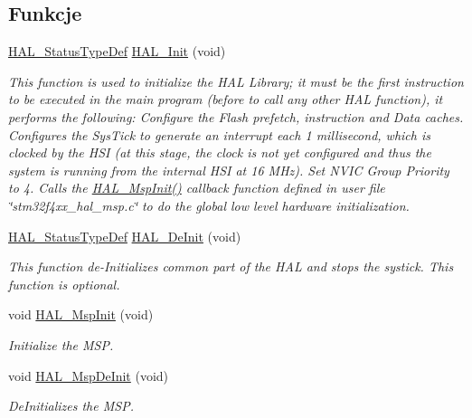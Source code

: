 \subsection*{Funkcje}
\begin{DoxyCompactItemize}
\item 
\hyperlink{stm32f4xx__hal__def_8h_a63c0679d1cb8b8c684fbb0632743478f}{H\+A\+L\+\_\+\+Status\+Type\+Def} \hyperlink{group___h_a_l___exported___functions___group1_gaecac54d350c3730e6831eb404e557dc4}{H\+A\+L\+\_\+\+Init} (void)
\begin{DoxyCompactList}\small\item\em This function is used to initialize the H\+AL Library; it must be the first instruction to be executed in the main program (before to call any other H\+AL function), it performs the following\+: Configure the Flash prefetch, instruction and Data caches. Configures the Sys\+Tick to generate an interrupt each 1 millisecond, which is clocked by the H\+SI (at this stage, the clock is not yet configured and thus the system is running from the internal H\+SI at 16 M\+Hz). Set N\+V\+IC Group Priority to 4. Calls the \hyperlink{stm32f4xx__hal__msp_8c_gae4fb8e66865c87d0ebab74a726a6891f}{H\+A\+L\+\_\+\+Msp\+Init()} callback function defined in user file \char`\"{}stm32f4xx\+\_\+hal\+\_\+msp.\+c\char`\"{} to do the global low level hardware initialization. \end{DoxyCompactList}\item 
\hyperlink{stm32f4xx__hal__def_8h_a63c0679d1cb8b8c684fbb0632743478f}{H\+A\+L\+\_\+\+Status\+Type\+Def} \hyperlink{group___h_a_l___exported___functions___group1_ga95911129a26afb05232caaaefa31956f}{H\+A\+L\+\_\+\+De\+Init} (void)
\begin{DoxyCompactList}\small\item\em This function de-\/\+Initializes common part of the H\+AL and stops the systick. This function is optional. \end{DoxyCompactList}\item 
void \hyperlink{group___h_a_l___exported___functions___group1_gae4fb8e66865c87d0ebab74a726a6891f}{H\+A\+L\+\_\+\+Msp\+Init} (void)
\begin{DoxyCompactList}\small\item\em Initialize the M\+SP. \end{DoxyCompactList}\item 
void \hyperlink{group___h_a_l___exported___functions___group1_gaa2d4540edcb9dacec34edb77f3455bf0}{H\+A\+L\+\_\+\+Msp\+De\+Init} (void)
\begin{DoxyCompactList}\small\item\em De\+Initializes the M\+SP. \end{DoxyCompactList}\item 

\end{DoxyCompactItemize}
